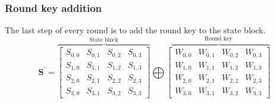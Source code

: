 \documentclass[report.tex]{subfiles}
\begin{document}
\subsubsection{Round key addition}
The last step of every round is to add the round key to the state block.
\begin{equation}\label{eq:round key}
	\mathbf{S^\text{'}} = 
	\overbrace{
	\begin{bmatrix}
	S_{0,0} & S_{0,1} & S_{0,2} & S_{0,3} \\
	S_{1,0} & S_{1,1} & S_{1,2} & S_{1,3} \\
	S_{2,0} & S_{2,1} & S_{2,2} & S_{2,3} \\
	S_{3,0} & S_{3,1} & S_{3,2} & S_{3,3}
	\end{bmatrix}}^\text{State block}
	\bigoplus
	\overbrace{
	\begin{bmatrix}
	W_{0,0} & W_{0,1} & W_{0,2} & W_{0,3} \\
	W_{1,0} & W_{1,1} & W_{1,2} & W_{1,3} \\
	W_{2,0} & W_{2,1} & W_{2,2} & W_{2,3} \\
	W_{3,0} & W_{3,1} & W_{3,2} & W_{3,3}
	\end{bmatrix}}^\text{Round key}
\end{equation}
\end{document}
